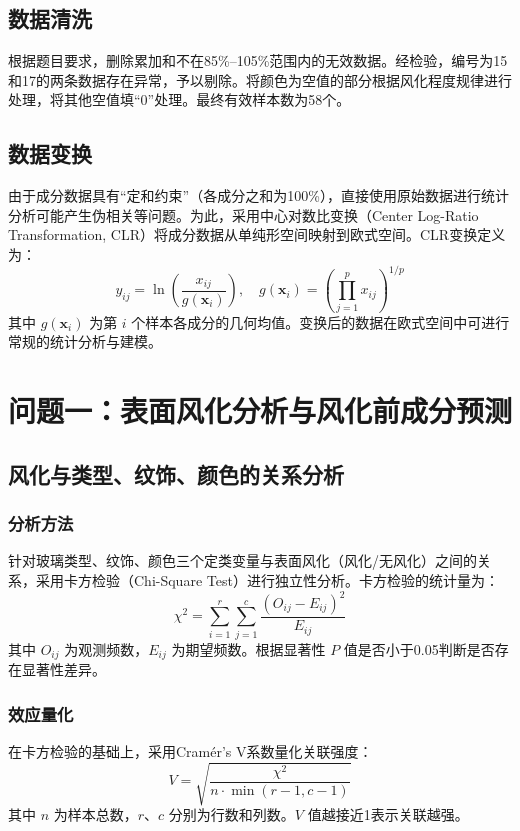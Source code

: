 \documentclass{cumcmthesis}
\begin{document}
\subsection{数据清洗}

根据题目要求，删除累加和不在85\%--105\%范围内的无效数据。经检验，编号为15和17的两条数据存在异常，予以剔除。将颜色为空值的部分根据风化程度规律进行处理，将其他空值填“0”处理。最终有效样本数为58个。

\subsection{数据变换}

由于成分数据具有“定和约束”（各成分之和为100\%），直接使用原始数据进行统计分析可能产生伪相关等问题。为此，采用中心对数比变换（Center Log-Ratio Transformation, CLR）将成分数据从单纯形空间映射到欧式空间。CLR变换定义为：
\begin{equation}
    y_{ij} = \ln\left(\frac{x_{ij}}{g(\mathbf{x}_i)}\right), \quad g(\mathbf{x}_i) = \left(\prod_{j=1}^{p} x_{ij}\right)^{1/p}
\end{equation}
其中 $g(\mathbf{x}_i)$ 为第 $i$ 个样本各成分的几何均值。变换后的数据在欧式空间中可进行常规的统计分析与建模。

\section{问题一：表面风化分析与风化前成分预测}

\subsection{风化与类型、纹饰、颜色的关系分析}

\subsubsection{分析方法}
针对玻璃类型、纹饰、颜色三个定类变量与表面风化（风化/无风化）之间的关系，采用卡方检验（Chi-Square Test）进行独立性分析。卡方检验的统计量为：
\begin{equation}
    \chi^2 = \sum_{i=1}^{r}\sum_{j=1}^{c}\frac{(O_{ij}-E_{ij})^2}{E_{ij}}
\end{equation}
其中 $O_{ij}$ 为观测频数，$E_{ij}$ 为期望频数。根据显著性 $P$ 值是否小于0.05判断是否存在显著性差异。

\subsubsection{效应量化}
在卡方检验的基础上，采用Cramér's V系数量化关联强度：
\begin{equation}
    V = \sqrt{\frac{\chi^2}{n \cdot \min(r-1, c-1)}}
\end{equation}
其中 $n$ 为样本总数，$r$、$c$ 分别为行数和列数。$V$ 值越接近1表示关联越强。
\end{document}
